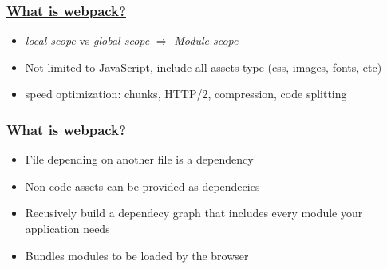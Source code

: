 \begin{frame}[fragile]
    \frametitle{\href{https://blog.jakoblind.no/whats-the-advantage-with-webpack/}{What is webpack?}}
    \begin{itemize}
        \item \textit{local scope} vs \textit{global scope} $\Rightarrow$ \textit{Module scope}
        \item Not limited to JavaScript, include all assets type (css, images, fonts, etc)
        \item speed optimization: chunks, HTTP/2, compression, code splitting
    \end{itemize}
\end{frame}

\begin{frame}
    \frametitle{\href{https://blog.jakoblind.no/whats-the-advantage-with-webpack/}{What is webpack?}}
    \begin{itemize}
        \item File depending on another file is a dependency
        \item Non-code assets can be provided as dependecies
        \item Recusively build a dependecy graph that includes every module your application needs
        \item Bundles modules to be loaded by the browser
    \end{itemize}
\end{frame}